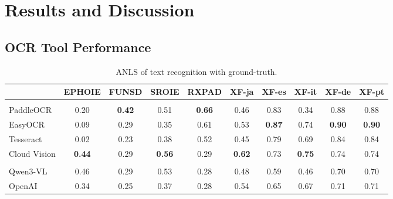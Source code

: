 \documentclass[11pt]{article}
\begin{document}
\section{Results and Discussion}


\subsection{OCR Tool Performance}
\begin{table}[t]
\centering
\caption{ANLS of text recognition with ground-truth.}
\label{tab:ocr_comparison}


\begin{adjustbox}{max width=\linewidth}
\begin{tabular}{lccccccccc}
\toprule
 & EPHOIE & FUNSD & SROIE & RXPAD & XF-ja & XF-es & XF-it & XF-de & XF-pt \\
\midrule
\rowcolor{gray!20}\multicolumn{10}{l}{OCR-engine-based}\\
PaddleOCR      & 0.20 & \textbf{0.42} & 0.51 & \textbf{0.66} & 0.46 & 0.83 & 0.34 & 0.88 & 0.88 \\
EasyOCR        & 0.09 & 0.29 & 0.35 & 0.61 & 0.53 & \textbf{0.87} & 0.74 & \textbf{0.90} & \textbf{0.90} \\
Tesseract      & 0.02 & 0.23 & 0.38 & 0.52 & 0.45 & 0.79 & 0.69 & 0.84 & 0.84 \\
Cloud Vision   & \textbf{0.44} & 0.29 & \textbf{0.56} & 0.29 & \textbf{0.62} & 0.73 & \textbf{0.75} & 0.74 & 0.74 \\
\midrule
\rowcolor{gray!20}\multicolumn{10}{l}{MLLM-based}\\
Qwen3-VL       & 0.46 & 0.29 & 0.53 & 0.28 & 0.48 & 0.59 & 0.46 & 0.70 & 0.70 \\
OpenAI         & 0.34 & 0.25 & 0.37 & 0.28 & 0.54 & 0.65 & 0.67 & 0.71 & 0.71 \\

\bottomrule
\end{tabular}
\end{adjustbox}
\vspace{-1em}
\end{table}

\end{document}
